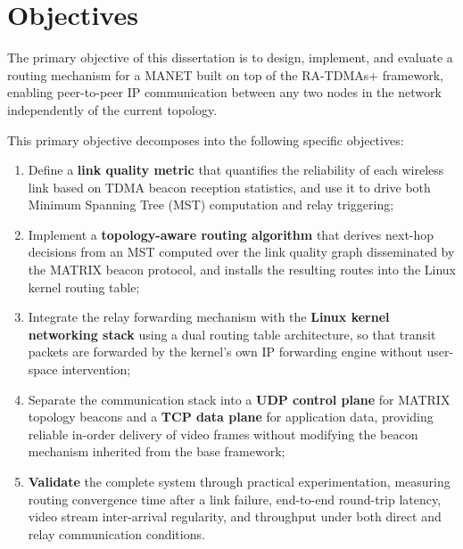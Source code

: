 \section{Objectives}
\label{sec:objectives}

The primary objective of this dissertation is to design, implement, and
evaluate a routing mechanism for a MANET built on top of the RA-TDMAs+
framework, enabling peer-to-peer IP communication between any two nodes in
the network independently of the current topology.

This primary objective decomposes into the following specific objectives:

\begin{enumerate}

    \item Define a \textbf{link quality metric} that quantifies the reliability
    of each wireless link based on TDMA beacon reception statistics, and use it
    to drive both Minimum Spanning Tree (MST) computation and relay triggering;

    \item Implement a \textbf{topology-aware routing algorithm} that derives
    next-hop decisions from an MST computed over the link quality graph
    disseminated by the MATRIX beacon protocol, and installs the resulting
    routes into the Linux kernel routing table;

    \item Integrate the relay forwarding mechanism with the \textbf{Linux
    kernel networking stack} using a dual routing table architecture, so that
    transit packets are forwarded by the kernel's own IP forwarding engine
    without user-space intervention;

    \item Separate the communication stack into a \textbf{UDP control plane}
    for MATRIX topology beacons and a \textbf{TCP data plane} for application
    data, providing reliable in-order delivery of video frames without modifying
    the beacon mechanism inherited from the base framework;

    \item \textbf{Validate} the complete system through practical
    experimentation, measuring routing convergence time after a link failure,
    end-to-end round-trip latency, video stream inter-arrival regularity, and
    throughput under both direct and relay communication conditions.

\end{enumerate}

